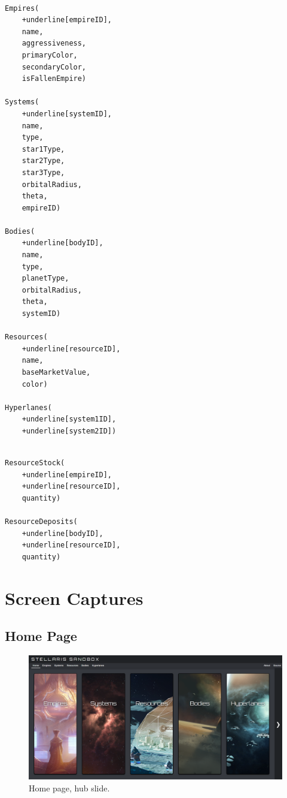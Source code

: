\documentclass[12pt]{article}
\let\Oldsection\section
\renewcommand{\section}{\FloatBarrier\Oldsection}
\let\Oldsubsection\subsection
\renewcommand{\subsection}{\FloatBarrier\Oldsubsection}
\begin{document}
\begin{multicols}{2}
\begin{small}
\begin{Verbatim}[commandchars=+\[\]]

Empires(
	+underline[empireID],
	name,
	aggressiveness,
	primaryColor,
	secondaryColor,
	isFallenEmpire)

Systems(
	+underline[systemID],
	name,
	type,
	star1Type,
	star2Type,
	star3Type,
	orbitalRadius,
	theta,
	empireID)

Bodies(
	+underline[bodyID],
	name,
	type,
	planetType,
	orbitalRadius,
	theta,
	systemID)

Resources(
	+underline[resourceID],
	name,
	baseMarketValue,
	color)

Hyperlanes(
	+underline[system1ID],
	+underline[system2ID])

\end{Verbatim}
\columnbreak
\begin{Verbatim}[commandchars=+\[\]]

ResourceStock(
	+underline[empireID],
	+underline[resourceID],
	quantity)

ResourceDeposits(
	+underline[bodyID],
	+underline[resourceID],
	quantity)

\end{Verbatim}
\end{small}
\end{multicols}

\newpage
\section{Screen Captures}

\subsection{Home Page}

\begin{figure}[!ht]
  \caption{Home page, hub slide.}
  \includegraphics[width=\textwidth]{screenshots/home/home_hub.png}
\end{figure}
\end{document}
